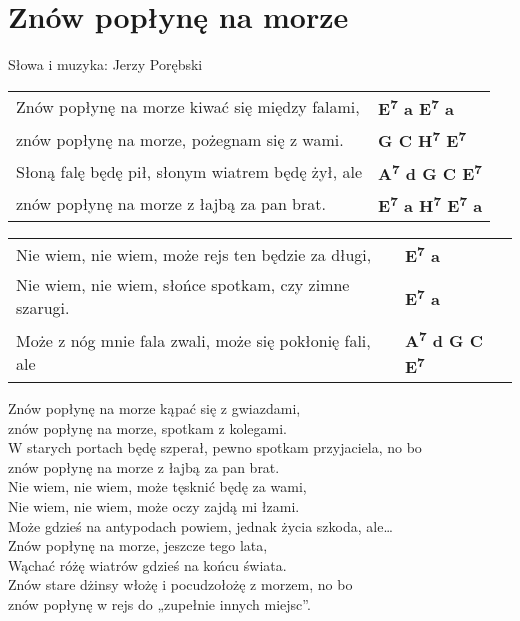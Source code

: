 \section{Znów popłynę na morze}

Słowa i muzyka: Jerzy Porębski

\vspace{2em}
\begin{tabular}{@{}p{10cm}@{}l@{}}
Znów popłynę na morze kiwać się między falami, & \bfseries E\textsuperscript{7} a E\textsuperscript{7} a \\
znów popłynę na morze, pożegnam się z wami. & \bfseries G C H\textsuperscript{7} E\textsuperscript{7} \\
Słoną falę będę pił, słonym wiatrem będę żył, ale & \bfseries A\textsuperscript{7} d G C E\textsuperscript{7} \\
znów popłynę na morze z łajbą za pan brat. & \bfseries E\textsuperscript{7} a H\textsuperscript{7} E\textsuperscript{7} a \\
\end{tabular}

\vspace{1em}
\begin{tabular}{@{}p{10cm}@{}l@{}}
Nie wiem, nie wiem, może rejs ten będzie za długi,  & \bfseries E\textsuperscript{7} a \\
Nie wiem, nie wiem, słońce spotkam, czy zimne szarugi.  & \bfseries E\textsuperscript{7} a \\
Może z nóg mnie fala zwali, może się pokłonię fali, ale  & \bfseries A\textsuperscript{7} d G C E\textsuperscript{7} \\
\end{tabular}

\vspace{1em}
Znów popłynę na morze kąpać się z gwiazdami, \\
znów popłynę na morze, spotkam z kolegami. \\
W starych portach będę szperał, pewno spotkam przyjaciela, no bo \\
znów popłynę na morze z łajbą za pan brat.  \\

Nie wiem, nie wiem, może tęsknić będę za wami, \\
Nie wiem, nie wiem, może oczy zajdą mi łzami. \\
Może gdzieś na antypodach powiem, jednak życia szkoda, ale… \\

Znów popłynę na morze, jeszcze tego lata, \\
Wąchać różę wiatrów gdzieś na końcu świata. \\
Znów stare dżinsy włożę i pocudzołożę z morzem, no bo \\
znów popłynę w rejs do „zupełnie innych miejsc”.